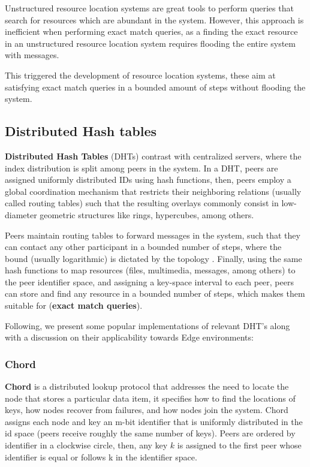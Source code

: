 Unstructured resource location systems are great tools to perform queries that search for resources which are abundant in the system. However, this approach is inefficient when performing exact match queries, as a finding the exact resource in an unstructured resource location system requires flooding the entire system with messages.

This triggered the development of resource location systems, these aim at satisfying exact match queries in a bounded amount of steps without flooding the system.

\subsection{Distributed Hash tables}

\textbf{Distributed Hash Tables} (DHTs) contrast with centralized servers, where the index distribution is split among peers in the system. In a DHT, peers are assigned uniformly distributed IDs using hash functions, then, peers employ a global coordination mechanism that restricts their neighboring relations (usually called routing tables) such that the resulting overlays commonly consist in low-diameter geometric structures like rings, hypercubes, among others. %

Peers maintain routing tables to forward messages in the system, such that they can contact any other participant in a bounded number of steps, where the bound (usually logarithmic) is dictated by the topology . Finally, using the same hash functions to map resources (files, multimedia, messages, among others) to the peer identifier space, and assigning a key-space interval to each peer, peers can store and find any resource in a bounded number of steps, which makes them suitable for (\textbf{exact match queries}).

Following, we present some popular implementations of relevant DHT's along with a discussion on their applicability towards Edge environments:

\subsubsection{Chord}

\textbf{Chord} \cite{stoica2003chord} is a distributed lookup protocol that addresses the need to locate the node that stores a particular data item, it specifies how to find the locations of keys, how nodes recover from failures, and how nodes join the system. Chord assigns each node and key an m-bit identifier that is uniformly distributed in the id space (peers receive roughly the same number of keys). Peers are ordered by identifier in a clockwise circle, then, any key \(k\) is assigned to the first peer whose identifier is equal or follows k in the identifier space. 


